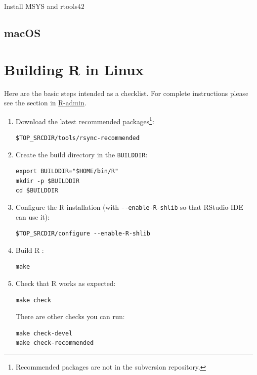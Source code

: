 \documentclass[
]{book}
\begin{document}
Install MSYS and rtools42

\hypertarget{macos}{%
\subsection{macOS}\label{macos}}

\hypertarget{building-r-in-linux}{%
\section{Building R in Linux}\label{building-r-in-linux}}

Here are the basic steps intended as a checklist.
For complete instructions please see the section in \href{https://cran.r-project.org/doc/manuals/r-devel/R-admin.html\#Installing-R-under-Unix_002dalikes}{R-admin}.

\begin{enumerate}
\def\labelenumi{\arabic{enumi}.}
\item
  Download the latest recommended packages\footnote{Recommended packages are not in the subversion repository.}:

\begin{verbatim}
$TOP_SRCDIR/tools/rsync-recommended
\end{verbatim}
\item
  Create the build directory in the \texttt{BUILDDIR}:

\begin{verbatim}
export BUILDDIR="$HOME/bin/R"
mkdir -p $BUILDDIR
cd $BUILDDIR
\end{verbatim}
\item
  Configure the R installation (with \texttt{-\/-enable-R-shlib} so that RStudio IDE can use it):

\begin{verbatim}
$TOP_SRCDIR/configure --enable-R-shlib
\end{verbatim}
\item
  Build R :

\begin{verbatim}
make 
\end{verbatim}
\item
  Check that R works as expected:

\begin{verbatim}
make check
\end{verbatim}

  There are other checks you can run:

\begin{verbatim}
make check-devel
make check-recommended
\end{verbatim}
\end{enumerate}
\end{document}
